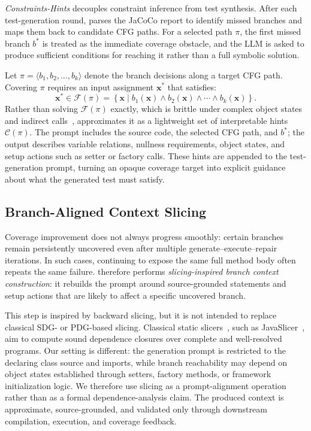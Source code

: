 \textit{Constraints-Hints} decouples constraint inference from test synthesis. After each test-generation round, \ourmethod{} parses the JaCoCo report to identify missed branches and maps them back to candidate CFG paths. For a selected path $\pi$, the first missed branch $b^*$ is treated as the immediate coverage obstacle, and the LLM is asked to produce sufficient conditions for reaching it rather than a full symbolic solution.

Let $\pi=\langle b_1,b_2,\ldots,b_k\rangle$ denote the branch decisions along a target CFG path. Covering $\pi$ requires an input assignment $\mathbf{x}^*$ that satisfies:
\begin{equation}
\mathbf{x}^* \in \mathcal{F}(\pi) =
\left\{
\mathbf{x} \mid
b_1(\mathbf{x}) \wedge b_2(\mathbf{x}) \wedge \cdots \wedge b_k(\mathbf{x})
\right\}.
\end{equation}
Rather than solving $\mathcal{F}(\pi)$ exactly, which is brittle under complex object states and indirect calls~\cite{baldoni2018, cadar2008klee}, \ourmethod{} approximates it as a lightweight set of interpretable hints $\mathcal{C}(\pi)$. The prompt includes the source code, the selected CFG path, and $b^*$; the output describes variable relations, nullness requirements, object states, and setup actions such as setter or factory calls. These hints are appended to the test-generation prompt, turning an opaque coverage target into explicit guidance about what the generated test must satisfy.

\subsection{Branch-Aligned Context Slicing}

Coverage improvement does not always progress smoothly: certain branches remain persistently uncovered even after multiple generate--execute--repair iterations. In such cases, continuing to expose the same full method body often repeats the same failure. \ourmethod{} therefore performs \emph{slicing-inspired branch context construction}: it rebuilds the prompt around source-grounded statements and setup actions that are likely to affect a specific uncovered branch.

This step is inspired by backward slicing, but it is not intended to replace classical SDG- or PDG-based slicing. Classical static slicers~\cite{weiser1984, ferrante1987}, such as JavaSlicer~\cite{JavaSlicer}, aim to compute sound dependence closures over complete and well-resolved programs. Our setting is different: the generation prompt is restricted to the declaring class source and imports, while branch reachability may depend on object states established through setters, factory methods, or framework initialization logic. We therefore use slicing as a prompt-alignment operation rather than as a formal dependence-analysis claim. The produced context is approximate, source-grounded, and validated only through downstream compilation, execution, and coverage feedback.

